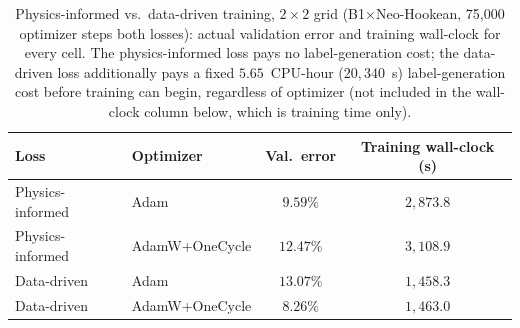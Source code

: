 \documentclass[final,5p,times]{elsarticle}
\begin{document}
\begin{table}[ht]
\centering
\caption{Physics-informed vs.\ data-driven training, $2\times2$ grid
  (B1$\times$Neo-Hookean, 75,000 optimizer steps both losses): actual
  validation error and training wall-clock for every cell. The
  physics-informed loss pays no label-generation cost; the data-driven
  loss additionally pays a fixed $5.65$~CPU-hour ($20{,}340$~s)
  label-generation cost before training can begin, regardless of
  optimizer (not included in the wall-clock column below, which is
  training time only).}
\label{tab:pi-vs-dd}
\small
\begin{tabular}{llcc}
\toprule
Loss & Optimizer & Val.\ error & Training wall-clock (s) \\
\midrule
Physics-informed & Adam             & $9.59\%$  & $2{,}873.8$ \\
Physics-informed & AdamW+OneCycle   & $12.47\%$ & $3{,}108.9$ \\
Data-driven       & Adam             & $13.07\%$ & $1{,}458.3$ \\
Data-driven       & AdamW+OneCycle   & $8.26\%$  & $1{,}463.0$ \\
\bottomrule
\end{tabular}
\end{table}
\end{document}
